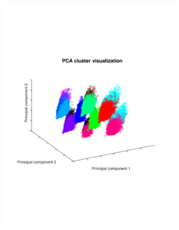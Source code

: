 \documentclass[a0]{a0poster}
\begin{document}
\begin{textblock}{7.0}
\begin{itemize}
  \begin{figure}[!h]
    \centering
    \includegraphics[trim=48pt 180pt 70pt 260pt, clip, width=0.8\textwidth]{viz-cluster.pdf}
    \label{fig:viz}
  \end{figure}

\end{itemize}

\end{textblock}
\end{document}
